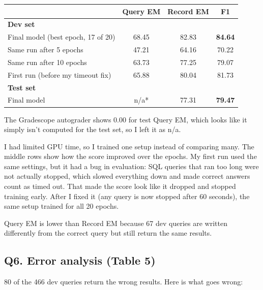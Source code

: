 \documentclass[11pt]{article}
\begin{document}
\begin{table}[H]
\centering
\begin{tabular}{|l|c|c|c|}
\hline
 & Query EM & Record EM & F1 \\ \hline
\multicolumn{4}{|l|}{\textbf{Dev set}} \\
Final model (best epoch, 17 of 20) & 68.45 & 82.83 & \textbf{84.64} \\
Same run after 5 epochs & 47.21 & 64.16 & 70.22 \\
Same run after 10 epochs & 63.73 & 77.25 & 79.07 \\
First run (before my timeout fix) & 65.88 & 80.04 & 81.73 \\ \hline
\multicolumn{4}{|l|}{\textbf{Test set}} \\
Final model & n/a* & 77.31 & \textbf{79.47} \\ \hline
\end{tabular}
\end{table}
{\small *The Gradescope autograder shows 0.00 for test Query EM, which looks like it simply
isn't computed for the test set, so I left it as n/a.}

I had limited GPU time, so I trained one setup instead of comparing many. The middle rows show how
the score improved over the epochs. My first run used the same settings, but it had a bug in
evaluation: SQL queries that ran too long were not actually stopped, which slowed everything down
and made correct answers count as timed out. That made the score look like it dropped and stopped
training early. After I fixed it (any query is now stopped after 60 seconds), the same setup
trained for all 20 epochs.

Query EM is lower than Record EM because 67 dev queries are written differently from the correct
query but still return the same results.

\subsection*{Q6. Error analysis (Table 5)}

80 of the 466 dev queries return the wrong results. Here is what goes wrong:
\end{document}
